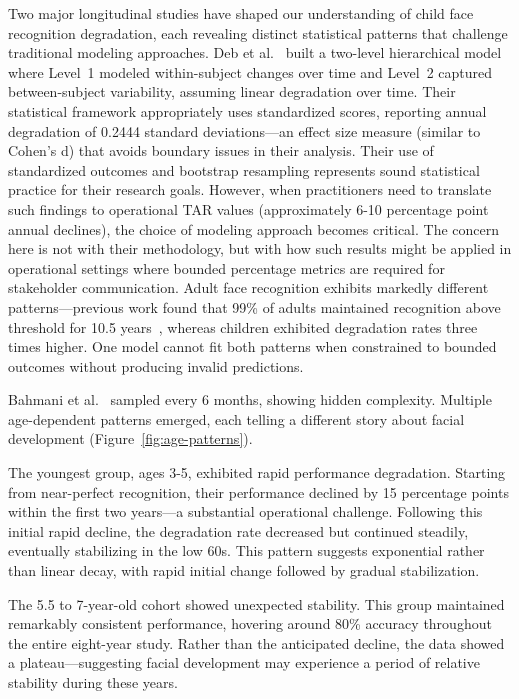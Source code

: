 \documentclass[10pt,journal,compsoc]{IEEEtran}
\begin{document}
Two major longitudinal studies have shaped our understanding of child face recognition degradation, each revealing distinct statistical patterns that challenge traditional modeling approaches. Deb et al.~\cite{deb2018} built a two-level hierarchical model where Level~1 modeled within-subject changes over time and Level~2 captured between-subject variability, assuming linear degradation over time. Their statistical framework appropriately uses standardized scores, reporting annual degradation of 0.2444 standard deviations---an effect size measure (similar to Cohen's d) that avoids boundary issues in their analysis. Their use of standardized outcomes and bootstrap resampling represents sound statistical practice for their research goals. However, when practitioners need to translate such findings to operational TAR values (approximately 6-10 percentage point annual declines), the choice of modeling approach becomes critical. The concern here is not with their methodology, but with how such results might be applied in operational settings where bounded percentage metrics are required for stakeholder communication. Adult face recognition exhibits markedly different patterns---previous work found that 99\% of adults maintained recognition above threshold for 10.5 years~\cite{bestrowden2018}, whereas children exhibited degradation rates three times higher. One model cannot fit both patterns when constrained to bounded outcomes without producing invalid predictions.

Bahmani et al.~\cite{bahmani2023} sampled every 6 months, showing hidden complexity. Multiple age-dependent patterns emerged, each telling a different story about facial development (Figure~\ref{fig:age-patterns}).

The youngest group, ages 3-5, exhibited rapid performance degradation. Starting from near-perfect recognition, their performance declined by 15 percentage points within the first two years---a substantial operational challenge. Following this initial rapid decline, the degradation rate decreased but continued steadily, eventually stabilizing in the low 60s. This pattern suggests exponential rather than linear decay, with rapid initial change followed by gradual stabilization.

The 5.5 to 7-year-old cohort showed unexpected stability. This group maintained remarkably consistent performance, hovering around 80\% accuracy throughout the entire eight-year study. Rather than the anticipated decline, the data showed a plateau---suggesting facial development may experience a period of relative stability during these years.
\end{document}
